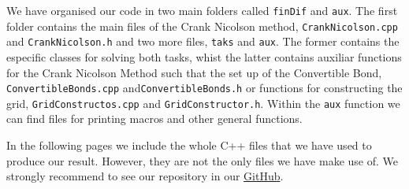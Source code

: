 We have organised our code in two main folders called \texttt{finDif} and \texttt{aux}. The first folder contains the main files of the Crank Nicolson method, \texttt{CrankNicolson.cpp} and \texttt{CrankNicolson.h} and two more files, \texttt{taks} and \texttt{aux}. The former contains the especific classes for solving both tasks, whist the latter contains auxiliar functions for the Crank Nicolson Method such that the set up of the Convertible Bond, \texttt{ConvertibleBonds.cpp} and\texttt{ConvertibleBonds.h} or functions for constructing the grid, \texttt{GridConstructos.cpp} and \texttt{GridConstructor.h}. Within the \texttt{aux} function we can find files for printing macros and other general functions.

In the following pages we include the whole C++ files that we have used to produce our result. However, they are not the only files we have make use of. We strongly recommend to see our repository in our \href{https://github.com/r-uben/assignment2.git}{GitHub}.

